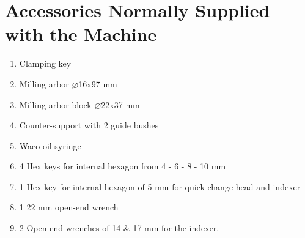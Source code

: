 \chapter{Accessories Normally Supplied with the Machine}

\begin{enumerate}
    \item Clamping key
    \item Milling arbor $\varnothing$16x97 mm
    \item Milling arbor block $\varnothing$22x37 mm
    \item Counter-support with 2 guide bushes
    \item Waco oil syringe
    \item 4 Hex keys for internal hexagon from 4 - 6 - 8 - 10 mm
    \item 1 Hex key for internal hexagon of 5 mm for quick-change head and indexer
    \item 1 22 mm open-end wrench
    \item 2 Open-end wrenches of 14 \& 17 mm for the indexer.
\end{enumerate}
